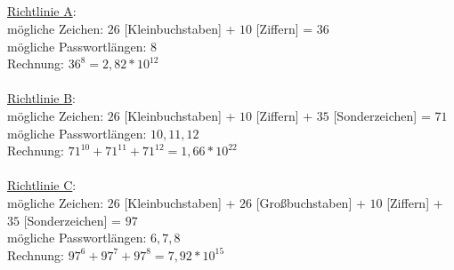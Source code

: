 \subsection{}
\underline{Richtlinie A}: \\
mögliche Zeichen: $ 26$ [Kleinbuchstaben] + $ 10 $ [Ziffern] = $36 $\\
mögliche Passwortlängen: $ 8 $\\
Rechnung: $ 36^8 = 2,82 * 10^{12} $\\
\\
\underline{Richtlinie B}: \\
mögliche Zeichen: $ 26$ [Kleinbuchstaben] + $ 10 $ [Ziffern] + $ 35 $ [Sonderzeichen] = $71 $\\
mögliche Passwortlängen: $ 10, 11, 12 $\\
Rechnung: $ 71^{10} + 71^{11} + 71^{12}= 1,66*10^{22} $\\
\\
\underline{Richtlinie C}: \\
mögliche Zeichen: $ 26$ [Kleinbuchstaben] + $ 26$ [Großbuchstaben] + $ 10 $ [Ziffern] + $ 35 $ [Sonderzeichen]  = $97$\\
mögliche Passwortlängen: $ 6, 7, 8 $\\
Rechnung: $ 97^6 + 97^7 + 97^8 = 7,92 * 10^{15} $\\
\\

